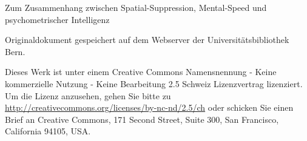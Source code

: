 \documentclass[11pt, twoside, a4paper]{book}		%
\begin{document}
\layout								%
\frontmatter						%


\begin{titlepage}

	\centering
		\huge Zum Zusammenhang zwischen Spatial-Suppression, Mental-Speed und psychometrischer Intelligenz 
	
	\noindent\makebox[\textwidth]{\rule{\textwidth}{0.4pt}}
	
	\vspace{1.2cm}
	

		\vspace*{\fill}
		\small
	\flushleft Originaldokument gespeichert auf dem Webserver der Universitätsbibliothek Bern.

	\vspace{.2cm}
	\vspace{0cm}

	\RaggedRight Dieses Werk ist unter einem Creative Commons Namensnennung - Keine kommerzielle Nutzung - Keine Bearbeitung 2.5 Schweiz Lizenzvertrag lizenziert. Um die Lizenz anzusehen, gehen Sie bitte zu \url{http://creativecommons.org/licenses/by-nc-nd/2.5/ch} oder schicken Sie einen Brief an Creative Commons, 171 Second Street, Suite 300, San Francisco, California 94105, USA.


\end{titlepage}
\end{document}

